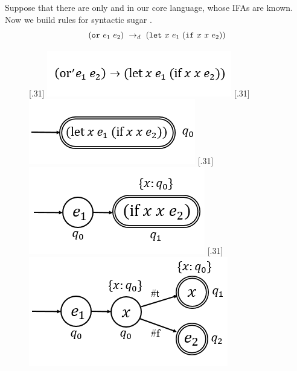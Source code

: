 \begin{example}

    Suppose that there are only  and  in our core language, whose IFAs are known. Now we build rules for syntactic sugar .
    \[
        (\mbox{\tt or}~e_1~e_2) ~\rightarrow_d~ (\mbox{\tt let}~x~e_1~(\mbox{\tt if}~x~x~e_2))
    \]

    \begin{figure}[t]
        \centering
        [.31\linewidth]{
            \includegraphics[scale=0.3]{images/ifa/ifa-ex-or-1.png}
        }
        [.31\linewidth]{
            \includegraphics[scale=0.3]{images/ifa/ifa-ex-or-2.png}
        }
        [.31\linewidth]{
            \includegraphics[scale=0.3]{images/ifa/ifa-ex-or-3.png}
        }
        [.31\linewidth]{
            \includegraphics[scale=0.3]{images/ifa/ifa-ex-or-4.png}
}
\end{figure}
\end{example}
